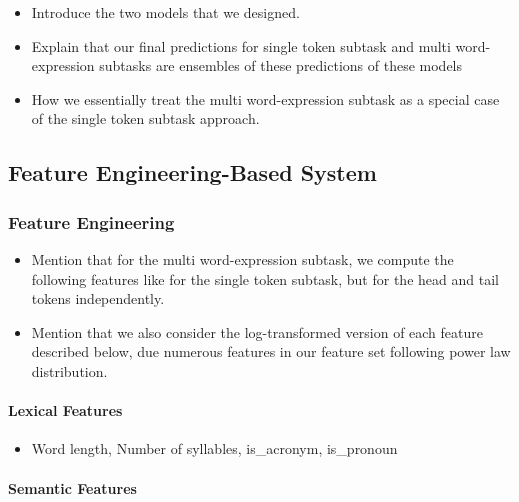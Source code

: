 \documentclass[11pt,a4paper]{article}
\begin{document}
\begin{itemize}
  \item Introduce the two models that we designed.
  \item Explain that our final predictions for single token subtask and multi word-expression subtasks are ensembles of these predictions of these models
  \item How we essentially treat the multi word-expression subtask as a special case of the single token subtask approach.
\end{itemize}

\subsection{Feature Engineering-Based System}

\subsubsection{Feature Engineering}

\begin{itemize}
  \item Mention that for the multi word-expression subtask, we compute the following features like for the single token subtask, but for the head and tail tokens independently.
  \item Mention that we also consider the log-transformed version of each feature described below, due numerous features in our feature set following power law distribution.
\end{itemize}

\paragraph{Lexical Features}

\begin{itemize}
  \item Word length, Number of syllables, is\_acronym, is\_pronoun
\end{itemize}
  
\paragraph{Semantic Features}
\end{document}
